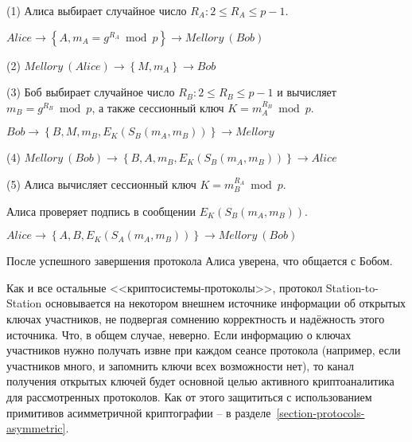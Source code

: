 \begin{protocol}
    \item[(1)] Алиса выбирает случайное число $R_A: 2 \leq R_A \leq p-1$.
    \item[{}] $Alice \to \left\{ A, m_A = g^{R_A} \bmod p \right\} \to Mellory~(Bob)$

    \item[(2)] $Mellory~(Alice) \to \left\{ M, m_A \right\} \to Bob$

    \item[(3)] Боб выбирает случайное число $R_B: 2 \leq R_B \leq p-1$ и вычисляет $m_B = g^{R_B} \bmod p$, а также сессионный ключ $K = m_A^{R_B} \bmod p$.
    \item[{}] $Bob \to \left\{ B, M, m_B, E_K( S_B ( m_A, m_B )) \right\} \to Mellory$

    \item[(4)] $Mellory~(Bob) \to \left\{ B, A, m_B, E_K( S_B ( m_A, m_B )) \right\} \to Alice$

    \item[(5)] Алиса вычисляет сессионный ключ $K = m_B^{R_A} \bmod p$.
    \item[{}] Алиса проверяет подпись в сообщении $E_K( S_B ( m_A, m_B ))$.
    \item[{}] $Alice \to \left\{ A, B, E_K( S_A ( m_A, m_B ) ) \right\} \to Mellory~(Bob)$
\end{protocol}

После успешного завершения протокола Алиса уверена, что общается с Бобом.

Как и все остальные <<криптосистемы-протоколы>>, протокол Station-to-Station основывается на некотором внешнем источнике информации об открытых ключах участников, не подвергая сомнению корректность и надёжность этого источника. Что, в общем случае, неверно. Если информацию о ключах участников нужно получать извне при каждом сеансе протокола (например, если участников много, и запомнить ключи всех возможности нет), то канал получения открытых ключей будет основной целью активного криптоаналитика для рассмотренных протоколов. Как от этого защититься с использованием примитивов асимметричной криптографии -- в разделе~\ref{section-protocols-asymmetric}.

